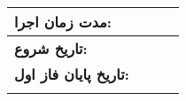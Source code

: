 {%
	\begin{table}
	\renewcommand{\arraystretch}{1.2}
	\begin{tabular}{Im{0.2\textwidth}|m{0.2\textwidth}I}\whline
	\tableFont\textbf{مدت زمان اجرا:}&\tableFont\textbf{\@executionTime}\\\hline
	\tableFont\textbf{تاريخ شروع:}&\tableFont\textbf{\@startData}\\\hline
	\tableFont\textbf{تاريخ پايان فاز اول:}&\tableFont\textbf{\@stopData}\\\whline
	\end{tabular}
	\end{table}
	\clearpage
}%

